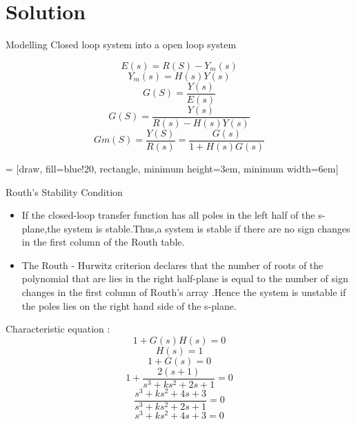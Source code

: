 \documentclass{beamer}
\begin{document}
\section{Solution}
\begin{frame}{Modelling Closed loop system into a open loop system}
\begin{centre}
$$
E(s) = R(S) - Y_m(s)
$$
$$Y_m(s) = H(s)Y(s)$$
$$
 G(S) = \frac{Y(s)}{E(s)}
$$
$$
 G(S) = \frac{Y(s)}{R(s) - H(s)Y(s)}
$$
$$
 Gm(S) = \frac{Y(S)}{R(s)} = \frac{G(s)}{1 + H(s)G(s)}
$$


\end{centre}
 = [draw, fill=blue!20, rectangle, 
    minimum height=3em, minimum width=6em]


\end{frame}
\begin{frame}{Routh's Stability Condition}
\begin{itemize}
   \item If the closed-loop transfer function has all poles in the left half of the s-plane,the system is stable.Thus,a system is stable if there are no sign changes in the first column of the Routh table.
   \item The Routh - Hurwitz criterion declares that the number of roots of the polynomial that are lies in the right half-plane is equal to the number of sign changes in the first column of Routh's array .Hence the system is unstable if the poles lies on the right hand side of the s-plane.
   
\end{itemize}

\end{frame}

\begin{frame}
Characteristic equation : $$1 + G(s)H(s) = 0$$
$$H(s) = 1 $$
$$ 1 + G(s) = 0$$
$$ 1 + \frac{2(s+1)}{s^3 + ks^2 + 2s +1} = 0$$
$$ \frac{s^3+ks^2+4s+3}{s^3 + ks^2 + 2s +1} = 0 $$
$$ s^3+ks^2+4s+3 = 0$$
\end{frame}
\end{document}
